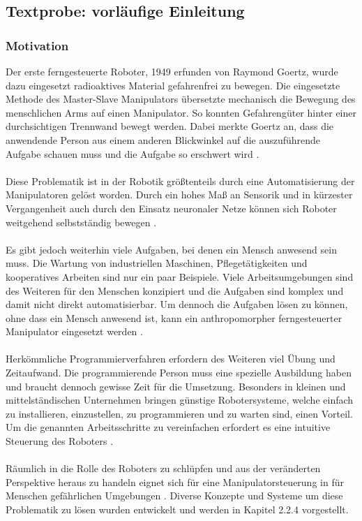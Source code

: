\subsection{Textprobe: vorläufige Einleitung}
\subsubsection{Motivation}
  Der erste ferngesteuerte Roboter, 1949 erfunden von Raymond Goertz, wurde dazu eingesetzt radioaktives Material gefahrenfrei zu bewegen. Die eingesetzte Methode des Master-Slave Manipulators übersetzte mechanisch die Bewegung des menschlichen Arms auf einen Manipulator. So konnten Gefahrengüter hinter einer durchsichtigen Trennwand bewegt werden. Dabei merkte Goertz an, dass die anwendende Person aus einem anderen Blickwinkel auf die auszuführende Aufgabe schauen muss und die Aufgabe so erschwert wird \cite{goertz_master-slave_1949}. \\\\
  Diese Problematik ist in der Robotik größtenteils durch eine Automatisierung der Manipulatoren gelöst worden. Durch ein hohes Maß an Sensorik und in kürzester Vergangenheit auch durch den Einsatz neuronaler Netze können sich Roboter weitgehend selbstständig bewegen \cite{siciliano_springer_2008}.\\\\
  Es gibt jedoch weiterhin viele Aufgaben, bei denen ein Mensch anwesend sein muss. Die Wartung von industriellen Maschinen, Pflegetätigkeiten und kooperatives Arbeiten sind nur ein paar Beispiele. Viele Arbeitsumgebungen sind des Weiteren für den Menschen konzipiert und die Aufgaben sind komplex und damit nicht direkt automatisierbar. Um dennoch die Aufgaben lösen zu können, ohne dass ein Mensch anwesend ist, kann ein anthropomorpher ferngesteuerter Manipulator eingesetzt werden \cite{tanie_mfi_2003}.\\\\
  Herkömmliche Programmierverfahren erfordern des Weiteren viel Übung und Zeitaufwand. Die programmierende Person muss eine spezielle Ausbildung haben und braucht dennoch gewisse Zeit für die Umsetzung. Besonders in kleinen und mittelständischen Unternehmen bringen günstige Robotersysteme, welche einfach zu installieren, einzustellen, zu programmieren und zu warten sind, einen Vorteil. Um die genannten Arbeitsschritte zu vereinfachen erfordert es eine intuitive Steuerung des Roboters \cite[S.76]{brogardh_present_2007} \cite[S.190]{ehlers_echtzeitfahige_2019}. \\\\
  Räumlich in die Rolle des Roboters zu schlüpfen und aus der veränderten Perspektive heraus zu handeln eignet sich für eine Manipulatorsteuerung in für Menschen gefährlichen Umgebungen \cite[S.9]{mareczek_grundlagen_2020}. Diverse Konzepte und Systeme um diese Problematik zu lösen wurden entwickelt und werden in Kapitel 2.2.4 vorgestellt.\\\\
